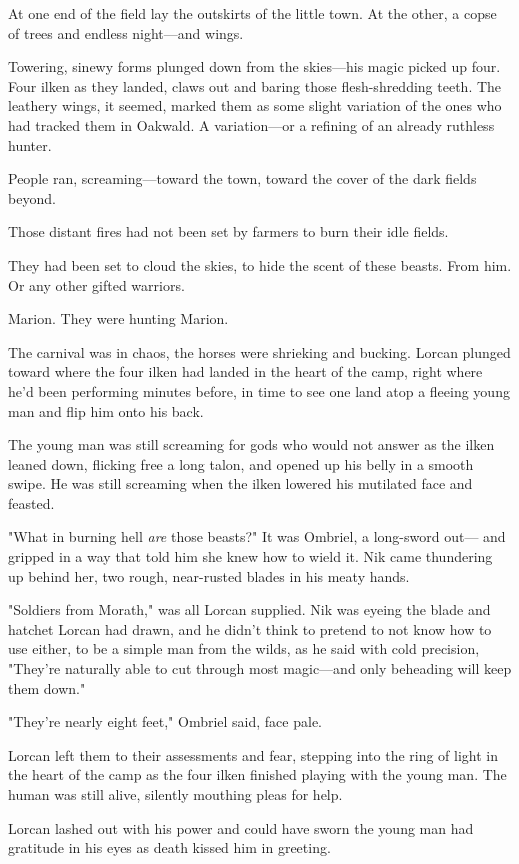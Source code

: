At one end of the field lay the outskirts of the little town. At the other, a copse of trees and endless night---and wings.

Towering, sinewy forms plunged down from the skies---his magic picked up four. Four ilken as they landed, claws out and baring those flesh-shredding teeth. The leathery wings, it seemed, marked them as some slight variation of the ones who had tracked them in Oakwald. A variation---or a refining of an already ruthless hunter.

People ran, screaming---toward the town, toward the cover of the dark fields beyond.

Those distant fires had not been set by farmers to burn their idle fields.

They had been set to cloud the skies, to hide the scent of these beasts. From him. Or any other gifted warriors.

Marion. They were hunting Marion.

The carnival was in chaos, the horses were shrieking and bucking. Lorcan plunged toward where the four ilken had landed in the heart of the camp, right where he'd been performing minutes before, in time to see one land atop a fleeing young man and flip him onto his back.

The young man was still screaming for gods who would not answer as the ilken leaned down, flicking free a long talon, and opened up his belly in a smooth swipe. He was still screaming when the ilken lowered his mutilated face and feasted.

"What in burning hell \emph{are} those beasts?" It was Ombriel, a long-sword out--- and gripped in a way that told him she knew how to wield it. Nik came thundering up behind her, two rough, near-rusted blades in his meaty hands.

"Soldiers from Morath," was all Lorcan supplied. Nik was eyeing the blade and hatchet Lorcan had drawn, and he didn't think to pretend to not know how to use either, to be a simple man from the wilds, as he said with cold precision, "They're naturally able to cut through most magic---and only beheading will keep them down."

"They're nearly eight feet," Ombriel said, face pale.

Lorcan left them to their assessments and fear, stepping into the ring of light in the heart of the camp as the four ilken finished playing with the young man. The human was still alive, silently mouthing pleas for help.

Lorcan lashed out with his power and could have sworn the young man had gratitude in his eyes as death kissed him in greeting.

